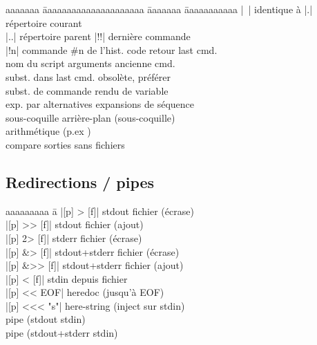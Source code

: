 \documentclass{article}
\begin{document}
\begin{multicols}{4}
    \begin{tabbing}
        aaaaaaa \= aaaaaaaaaaaaaaaaaaaaa \= aaaaaaa \= aaaaaaaaaaa \kill
        \code|~| \> identique à  \>
        \code|.| \> répertoire courant \\
        \code|..| \> répertoire parent \>
        \code|!!| \> dernière commande \\
        \code|!n| \> commande \#n de l'hist. \>
         \> code retour last cmd. \\
         \> nom du script \>
        \code{!*} \> arguments ancienne cmd. \\
         \> subst. dans last cmd. \>
         \> obsolète, préférer  \\
         \> subst. de commande \>
         \> rendu de variable \\
         \> exp. par alternatives \>
         \> expansions de séquence \\
          sous-coquille
          arrière-plan (sous-coquille) \\
         arithmétique (p.ex ) \\
         \quad compare sorties sans fichiers \\
    \end{tabbing}

    \subsection*{Redirections / pipes}
    \begin{tabbing}
        aaaaaaaaa \= a \kill
        \code|[p] > [f]| \> stdout \textrightarrow{} fichier (écrase) \\
        \code|[p] >> [f]| \> stdout \textrightarrow{} fichier (ajout) \\
        \code|[p] 2> [f]| \> stderr \textrightarrow{} fichier (écrase) \\
        \code|[p] &> [f]| \> stdout+stderr \textrightarrow{} fichier (écrase) \\
        \code|[p] &>> [f]| \> stdout+stderr \textrightarrow{} fichier (ajout) \\
        \code|[p] < [f]| \> stdin depuis fichier \\
        \code|[p] << EOF| \> heredoc (jusqu'à EOF) \\
        \code|[p] <<< "s"| \> here-string (inject sur stdin) \\
        \code{[p] | [p]} \> pipe (stdout \textrightarrow{} stdin) \\
        \code{[p] |& [p]} \> pipe (stdout+stderr \textrightarrow{} stdin)
    \end{tabbing}


\end{multicols}
\end{document}
